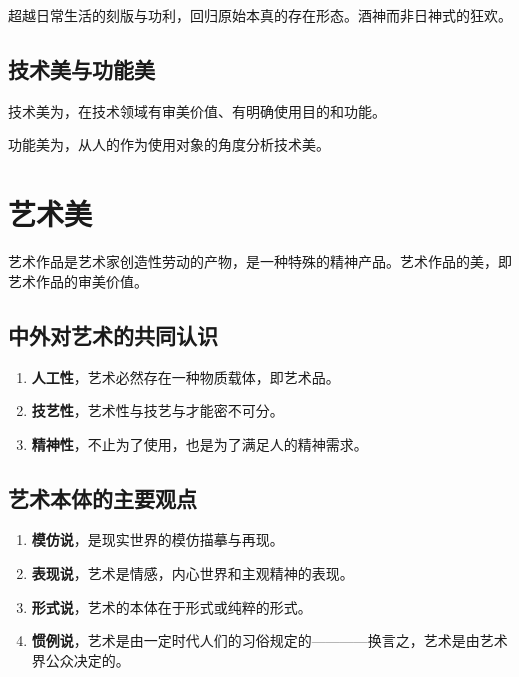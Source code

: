 \documentclass{NoteThesis/note-thesis}
\begin{document}
\begin{mynote_env}[frametitle={节日欢庆的美}]
    超越日常生活的刻版与功利，回归原始本真的存在形态。酒神而非日神式的狂欢。
\end{mynote_env}

\subsection{技术美与功能美}

技术美为，在技术领域有审美价值、有明确使用目的和功能。

功能美为，从人的作为使用对象的角度分析技术美。

\section{\texorpdfstring{\mbox{}}{} 艺术美}

艺术作品是艺术家创造性劳动的产物，是一种特殊的精神产品。艺术作品的美，即艺术作品的审美价值。

\subsection{中外对艺术的共同认识}

\begin{enumerate}
    \item \textbf{人工性}，艺术必然存在一种物质载体，即艺术品。
    \item \textbf{技艺性}，艺术性与技艺与才能密不可分。
    \item \textbf{精神性}，不止为了使用，也是为了满足人的精神需求。
\end{enumerate}

\subsection{艺术本体的主要观点}

\begin{enumerate}
    \item \textbf{模仿说}，是现实世界的模仿描摹与再现。
    \item \textbf{表现说}，艺术是情感，内心世界和主观精神的表现。
    \item \textbf{形式说}，艺术的本体在于形式或纯粹的形式。
    \item \textbf{惯例说}，艺术是由一定时代人们的习俗规定的————换言之，艺术是由艺术界公众决定的。
\end{enumerate}
\end{document}
